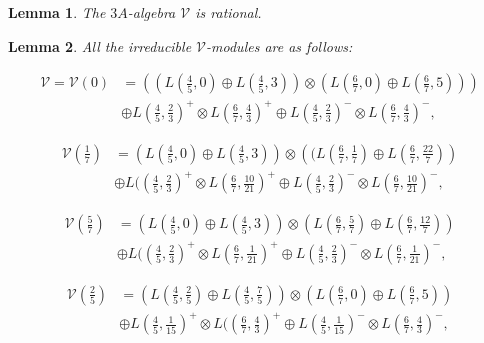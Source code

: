 \documentclass{article}
\newtheorem{lemma}{Lemma}[section]
\begin{document}
	\begin{lemma} \label{rationality of 3A}The $3A$-algebra $\mathcal{V}$
		is rational. \end{lemma}
	
	\begin{lemma} \label{U_3A modules} All the irreducible $\mathcal{V}$-modules
		are as follows:
		
		\begin{align*}
			\mathcal{V}=\mathcal{V}\left(0\right) & =\left(\left(L\left(\frac{4}{5},0\right)\oplus L\left(\frac{4}{5},3\right)\right)\otimes\left(L\left(\frac{6}{7},0\right)\oplus L\left(\frac{6}{7},5\right)\right)\right)\\
			& \oplus L\left(\frac{4}{5},\frac{2}{3}\right)^{+}\otimes L\left(\frac{6}{7},\frac{4}{3}\right)^{+}\oplus L\left(\frac{4}{5},\frac{2}{3}\right)^{-}\otimes L\left(\frac{6}{7},\frac{4}{3}\right)^{-},
		\end{align*}
		
		\begin{align*}
			\mathcal{V}\left(\frac{1}{7}\right) & =\left(L\left(\frac{4}{5},0\right)\oplus L\left(\frac{4}{5},3\right)\right)\otimes\left((L\left(\frac{6}{7},\frac{1}{7}\right)\oplus L\left(\frac{6}{7},\frac{22}{7}\right)\right)\\
			& \oplus L(\left(\frac{4}{5},\frac{2}{3}\right)^{+}\otimes L\left(\frac{6}{7},\frac{10}{21}\right)^{+}\oplus L\left(\frac{4}{5},\frac{2}{3}\right)^{-}\otimes L\left(\frac{6}{7},\frac{10}{21}\right)^{-},
		\end{align*}
		
		\begin{align*}
			\mathcal{V}\left(\frac{5}{7}\right) & =\left(L\left(\frac{4}{5},0\right)\oplus L\left(\frac{4}{5},3\right)\right)\otimes\left(L\left(\frac{6}{7},\frac{5}{7}\right)\oplus L\left(\frac{6}{7},\frac{12}{7}\right)\right)\\
			& \oplus L(\left(\frac{4}{5},\frac{2}{3}\right)^{+}\otimes L\left(\frac{6}{7},\frac{1}{21}\right)^{+}\oplus L\left(\frac{4}{5},\frac{2}{3}\right)^{-}\otimes L\left(\frac{6}{7},\frac{1}{21}\right)^{-},
		\end{align*}
		
		\begin{align*}
			\mathcal{V}\left(\frac{2}{5}\right) & =\left(L\left(\frac{4}{5},\frac{2}{5}\right)\oplus L\left(\frac{4}{5},\frac{7}{5}\right)\right)\otimes\left(L\left(\frac{6}{7},0\right)\oplus L\left(\frac{6}{7},5\right)\right)\\
			& \oplus L\left(\frac{4}{5},\frac{1}{15}\right)^{+}\otimes L(\left(\frac{6}{7},\frac{4}{3}\right)^{+}\oplus L\left(\frac{4}{5},\frac{1}{15}\right)^{-}\otimes L\left(\frac{6}{7},\frac{4}{3}\right)^{-},
		\end{align*}
		

\end{lemma}
\end{document}

